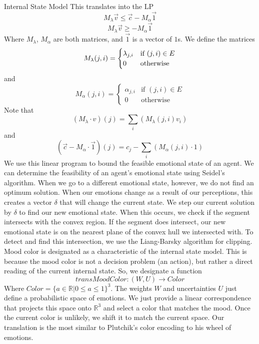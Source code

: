 \documentclass[11pt]{article}
\begin{document}
\begin{section}{Internal State Model}
This translates into the LP
\[M_{\lambda}\vec{v} \le \vec{c} - M_{\alpha} \vec{1}\]
\[M_{\lambda}\vec{v}  \ge - M_{\alpha} \vec{1}\]
Where $M_\lambda$, $M_\alpha$ are both matrices, and $\vec{1}$ is a vector of $1$s. We define the matrices 
\[M_{\lambda}(j, i) = 
\begin{cases}
\lambda_{j, i} & \textnormal{if }(j, i) \in E\\
0 & \textnormal{otherwise}
\end{cases}\]
and
\[M_{\alpha}(j, i) = 
\begin{cases}
\alpha_{j, i} & \mbox{if }(j, i) \in E\\
0 & \mbox{otherwise}
\end{cases}\]
Note that 
\[(M_{\lambda} \cdot v)(j) = \sum_i\left(M_{\lambda}(j, i)v_i\right)\]
and 
\[(\vec{c} - M_{\alpha}\cdot\vec{1})(j) = c_j - \sum_i \left(M_{\alpha}(j, i)\cdot 1\right)\]
We use this linear program to bound the feasible emotional state of an agent. We can determine the feasibility of an agent's emotional state using Seidel's algorithm. When we go to a different emotional state, however, we do not find an optimum solution. When our emotions change as a result of our perceptions, this creates a vector $\delta$ that will change the current state. We step our current solution by $\delta$ to find our new emotional state. When this occurs, we check if the segment intersects with the convex region. If the segment does intersect, our new emotional state is on the nearest plane of the convex hull we intersected with. To detect and find this intersection, we use the Liang-Barsky algorithm for clipping.\\

Mood color is designated as a characteristic of the internal state model. This is because the mood color is not a decision problem (an action), but rather a direct reading of the current internal state. So, we designate a function 
\[transMoodColor : (W, U) \rightarrow Color\]
Where $Color = \{a \in \mathbb{R}| 0 \le a \le 1\}^3$. The weights $W$ and uncertainties $U$ just define a probabilistic space of emotions. We just provide a linear correspondence that projects this space onto $\mathbb{R}^3$ and select a color that matches the mood. Once the current color is unlikely, we shift it to match the current space. Our translation is the most similar to Plutchik's color encoding to his wheel of emotions.  

\end{section}
\end{document}
